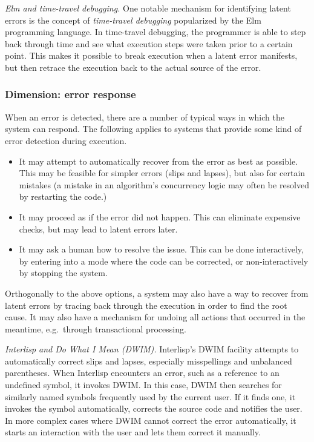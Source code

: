 \documentclass[english,submission]{programming}
\begin{document}
\emph{Elm and time-travel debugging.} One notable mechanism for
identifying latent errors is the concept of \emph{time-travel debugging}
popularized by the Elm programming language. In time-travel debugging,
the programmer is able to step back through time and see what execution
steps were taken prior to a certain point. This makes it possible to
break execution when a latent error manifests, but then retrace the
execution back to the actual source of the error.

\hypertarget{dimension-error-response}{%
\subsubsection{Dimension: error
response}\label{dimension-error-response}}

When an error is detected, there are a number of typical ways in which
the system can respond. The following applies to systems that provide
some kind of error detection during execution.

\begin{itemize}
\tightlist
\item
  It may attempt to automatically recover from the error as best as
  possible. This may be feasible for simpler errors (slips and lapses),
  but also for certain mistakes (a mistake in an algorithm's concurrency
  logic may often be resolved by restarting the code.)
\item
  It may proceed as if the error did not happen. This can eliminate
  expensive checks, but may lead to latent errors later.
\item
  It may ask a human how to resolve the issue. This can be done
  interactively, by entering into a mode where the code can be
  corrected, or non-interactively by stopping the system.
\end{itemize}

Orthogonally to the above options, a system may also have a way to
recover from latent errors by tracing back through the execution in
order to find the root cause. It may also have a mechanism for undoing
all actions that occurred in the meantime, e.g.~through transactional
processing.

\emph{Interlisp and Do What I Mean (DWIM).} Interlisp's DWIM facility
attempts to automatically correct slips and lapses, especially
misspellings and unbalanced parentheses. When Interlisp encounters an
error, such as a reference to an undefined symbol, it invokes DWIM. In
this case, DWIM then searches for similarly named symbols frequently
used by the current user. If it finds one, it invokes the symbol
automatically, corrects the source code and notifies the user. In more
complex cases where DWIM cannot correct the error automatically, it
starts an interaction with the user and lets them correct it manually.
\end{document}

